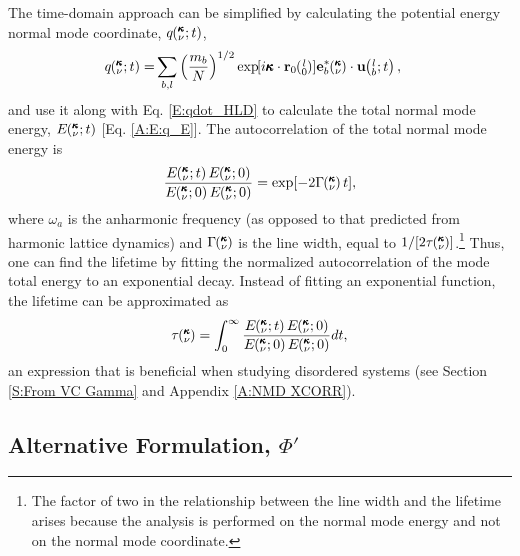 The time-domain approach can be simplified by calculating the  
potential energy normal mode coordinate, $q\mspace{-4.0mu}\left(\mspace{-8.0mu} \begin{smallmatrix}&\pmb{\kappa} \\&\nu\end{smallmatrix} \mspace{-2.0mu};t\right)$, 
\begin{equation}\label{E:q_HLD}
\begin{split}
q\kvt=& \sum_{b,l} \left(\frac{m_b}{N}\right)^{1/2} \EXP{i\pmb{\kappa}
\cdot\mathbf{r}_0\ab{l}{0}} \mathbf{e}_b^*\kv \cdot \mathbf{u}\lbt,
\end{split}
\end{equation}
and use it along with Eq. \eqref{E:qdot_HLD} to calculate the 
total normal mode energy, $E\mspace{-4.0mu}\left(\mspace{-8.0mu} \begin{smallmatrix}&\pmb{\kappa} \\&\nu\end{smallmatrix} \mspace{-2.0mu};t\right)$ [Eq. \eqref{A:E:q_E}]. 
The autocorrelation of the total normal mode energy is 
\begin{equation}\label{E:E_xcorr}
\begin{split}
\frac{E\kvt E\kvzero}{E \kvzero E\kvzero} = \exp[-2 \Gamma \kv t],
\end{split}
\end{equation}
where $\omega_a$ is the anharmonic frequency (as opposed to that predicted 
from harmonic lattice dynamics) and $\Gamma \mspace{-4.0mu}\left(\mspace{-8.0mu} \begin{smallmatrix}&\pmb{\kappa} \\&\nu\end{smallmatrix} \mspace{-3.0mu}\right)$ is the line width, equal 
to $1/[2 \tau \mspace{-4.0mu}\left(\mspace{-8.0mu} \begin{smallmatrix}&\pmb{\kappa} \\&\nu\end{smallmatrix} \mspace{-3.0mu}\right)]$.\footnote{The factor of two in the relationship 
between the line width and the lifetime arises because the analysis is 
performed on the normal mode energy and not on the normal mode coordinate.} 
Thus, one can find the lifetime by fitting the normalized autocorrelation 
of the mode total energy to an exponential decay. Instead of fitting an 
exponential function, the lifetime can be approximated as
\begin{equation}\label{E:tau_E_xcorr}
\begin{split}
\tau \kv = \int_0^{\infty} \frac{E\kvt E\kvzero}{E \kvzero E\kvzero} 
dt,
\end{split}
\end{equation}
an expression that is beneficial when studying disordered systems 
(see Section \ref{S:From VC Gamma} and Appendix \ref{A:NMD XCORR}).  

\subsection{\label{S:Subsection_Proposed_SED}Alternative Formulation, 
$\Phi'$}

